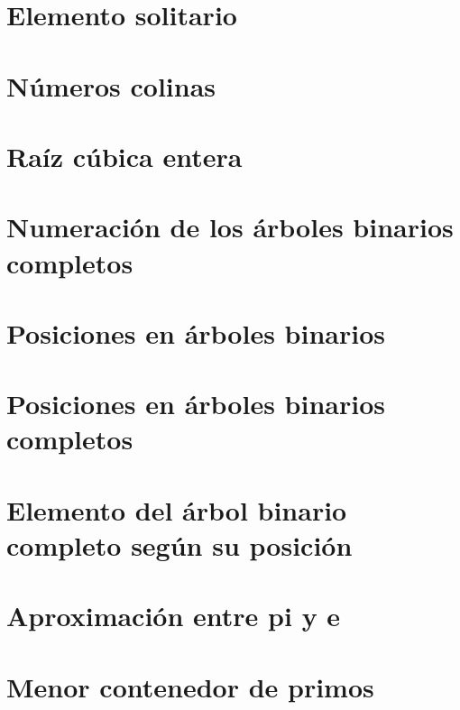\documentclass[a4paper,12pt,twoside]{book}
\begin{document}
\chapter{Elemento solitario}

\chapter{Números colinas}

\chapter{Raíz cúbica entera}


\chapter{Numeración de los árboles binarios completos}
\label{031218}

\chapter{Posiciones en árboles binarios}
\label{041218}

\chapter{Posiciones en árboles binarios completos}
\label{051218}

\chapter{Elemento del árbol binario completo según su
  posición}
\label{061218}

\chapter{Aproximación entre pi y e}
\label{071218}


\chapter{Menor contenedor de primos}
\label{101218}
\end{document}
